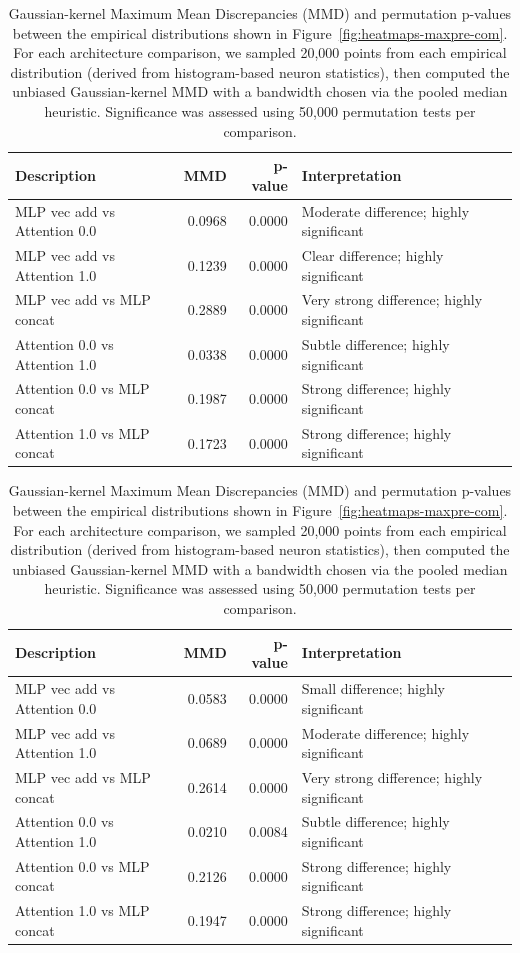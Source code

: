 \documentclass{article} %
\theoremstyle{plain}
\theoremstyle{definition}
\newtheorem{empirical fact}[theorem]{Empirical Fact}
\begin{document}
\begin{table}[h]
\centering
\begin{subtable}[b]{\textwidth}
\centering
\begin{tabular}{lrrl}
\toprule
Description & MMD & p-value & Interpretation \\
\midrule
MLP vec add vs Attention 0.0 & 0.0968 & 0.0000 & Moderate difference; highly significant \\
MLP vec add vs Attention 1.0 & 0.1239 & 0.0000 & Clear difference; highly significant \\
MLP vec add vs MLP concat    & 0.2889 & 0.0000 & Very strong difference; highly significant \\
Attention 0.0 vs Attention 1.0 & 0.0338 & 0.0000 & Subtle difference; highly significant \\
Attention 0.0 vs MLP concat    & 0.1987 & 0.0000 & Strong difference; highly significant \\
Attention 1.0 vs MLP concat    & 0.1723 & 0.0000 & Strong difference; highly significant \\
\bottomrule
\end{tabular}
\caption{Row 1: Max activation}
\end{subtable}

\vspace{0.75em}

\begin{subtable}[t]{\textwidth}
\centering
\begin{tabular}{lrrl}
\toprule
Description & MMD & p-value & Interpretation \\
\midrule
MLP vec add vs Attention 0.0 & 0.0583 & 0.0000 & Small difference; highly significant \\
MLP vec add vs Attention 1.0 & 0.0689 & 0.0000 & Moderate difference; highly significant \\
MLP vec add vs MLP concat    & 0.2614 & 0.0000 & Very strong difference; highly significant \\
Attention 0.0 vs Attention 1.0 & 0.0210 & 0.0084 & Subtle difference; highly significant \\
Attention 0.0 vs MLP concat    & 0.2126 & 0.0000 & Strong difference; highly significant \\
Attention 1.0 vs MLP concat    & 0.1947 & 0.0000 & Strong difference; highly significant \\
\bottomrule
\end{tabular}
\caption{Row 2: Center of mass}
\end{subtable}
\caption{Gaussian-kernel Maximum Mean Discrepancies (MMD) \cite{gretton2012kernel} and permutation p-values between the empirical distributions shown in Figure~\ref{fig:heatmaps-maxpre-com}. For each architecture comparison, we sampled 20,000 points from each empirical distribution (derived from histogram-based neuron statistics), then computed the unbiased Gaussian-kernel MMD with a bandwidth chosen via the pooled median heuristic. Significance was assessed using 50,000 permutation tests per comparison.}
\label{tab:mmd_results}
\end{table}
\end{document}
